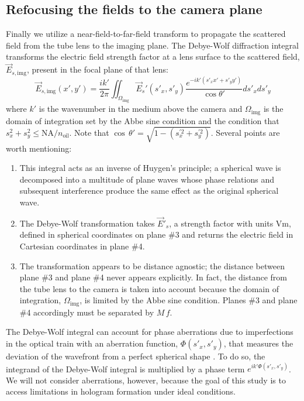 \subsection{Refocusing the fields to the camera plane}
Finally we utilize a near-field-to-far-field transform to propagate the scattered
field from the tube lens to the imaging plane.
The Debye-Wolf diffraction integral transforms the electric field strength factor at a lens
surface to the scattered field, $\vec{E}_{s,\text{img}}$, present in the focal plane of that
lens:
\begin{equation}
  \vec{E}_{s,\text{img}}(x', y') = \frac{i k'}{2 \pi} \iint_{\Omega_{\text{img}}} \vec{E}_s'(s'_x, s'_y) \frac{e^{-ik'(s'_xx'+s'_yy')}}{\cos{\theta'}}ds'_xds'_y 
  \label{eq:debyewolf}
\end{equation}
where $k'$ is the wavenumber in the medium above the camera and $\Omega_{\text{img}}$
is the domain of integration set by the Abbe sine condition and the condition
that $s_x^2+s_y^2 \le \text{NA}/n_{\text{oil}}$. Note that $\cos \, \theta' = \sqrt{ 1 - (s_x^{\prime 2} + s_y^{\prime 2} )}$. Several points are worth mentioning:
\begin{enumerate}
\item This integral acts as an inverse of Huygen's principle; a spherical wave is
  decomposed into a multitude of plane waves whose phase relations and subsequent
  interference produce the same effect as the original spherical wave.
\item The Debye-Wolf transformation takes $\vec{E}'_s$, a strength factor with units
  $\si{\volt\meter}$, defined in spherical coordinates on plane \#\num{3} and
  returns the electric field in Cartesian coordinates in plane \#\num{4}.
\item The transformation appears to be distance agnostic; the distance
  between plane \#\num{3} and plane \#\num{4} never appears explicitly.
  In fact, the distance from the tube lens to the camera is taken into
  account because the domain
  of integration, $\Omega_{\text{img}}$, is limited by the Abbe sine condition.
  Planes \#\num{3} and plane \#\num{4} accordingly must be separated by $M \, f$.
\end{enumerate}

The Debye-Wolf integral can account for phase aberrations
due to imperfections in the optical train with an aberration function, $\Phi(s'_x,s'_y)$,
that measures the deviation of the wavefront from a perfect spherical shape \cite{wolf1959}.
To do so, the integrand of the Debye-Wolf integral is multiplied by a phase term
$e^{ik'\Phi(s'_x,s'_y)}$. We will not consider aberrations, however, because
the goal of this study is to access limitations in hologram formation
under ideal conditions.

